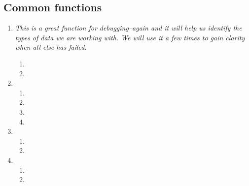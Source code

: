 \subsection{Common functions}
\begin{enumerate}[resume*]

\item {}
  \newline
  \emph{
    This is a great function for debugging--again and it will help us identify the types of
    data we are working with.  We will use it a few times to gain clarity when all else has
    failed.
  }
  \begin{enumerate}
    \item {}
    \item {}
  \end{enumerate}
  
\item {}
  \begin{enumerate}
  \item {}
  \item {}
  \item {}
  \item {}
  \end{enumerate}

\item {}
  \begin{enumerate}
  \item {}
  \item {}
  \end{enumerate}

\item {}
  \begin{enumerate}
  \item {}
  \item {}  
  \end{enumerate}
\end{enumerate}

